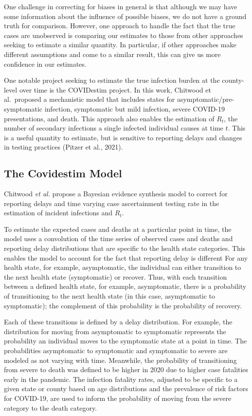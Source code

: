 \documentclass[12pt,twoside]{smiththesis}
\begin{document}
One challenge in correcting for biases in general is that although we may have some information about the influence of possible biases, we do not have a ground truth for comparison. However, one approach to handle the fact that the true cases are unobserved is comparing our estimates to those from other approaches seeking to estimate a similar quantity. In particular, if other approaches make different assumptions and come to a similar result, this can give us more confidence in our estimates.

One notable project seeking to estimate the true infection burden at the county-level over time is the COVIDestim project. In this work, Chitwood et al.~proposed a mechanistic model that includes states for asymptomatic/pre-symptomatic infection, symptomatic but mild infection, severe COVID-19 presentations, and death. This approach also enables the estimation of \(R_t\), the number of secondary infections a single infected individual causes at time \(t\). This is a useful quantity to estimate, but is sensitive to reporting delays and changes in testing practices (Pitzer et al., 2021).

\hypertarget{the-covidestim-model}{%
\subsection{The Covidestim Model}\label{the-covidestim-model}}

Chitwood \emph{et al.} propose a Bayesian evidence synthesis model to correct for reporting delays and time varying case ascertainment testing rate in the estimation of incident infections and \(R_t\).

To estimate the expected cases and deaths at a particular point in time, the model uses a convolution of the time series of observed cases and deaths and reporting delay distributions that are specific to the health state categories. This enables the model to account for the fact that reporting delay is different For any health state, for example, asymptomatic, the individual can either transition to the next health state (symptomatic) or recover. Thus, with each transition between a defined health state, for example, asymptomatic, there is a probability of transitioning to the next health state (in this case, asymptomatic to symptomatic); the complement of this probability is the probability of recovery.

Each of these transitions is defined by a delay distribution. For example, the distribution for moving from asymptomatic to symptomatic represents the probability an individual moves to the symptomatic state at a point in time. The probabilities asymptomatic to symptomatic and symptomatic to severe are modeled as not varying with time. Meanwhile, the probability of transitioning from severe to death was defined to be higher in 2020 due to higher case fatalities early in the pandemic. The infection fatality rates, adjusted to be specific to a given state or county based on age distributions and the prevalence of risk factors for COVID-19, are used to inform the probability of moving from the severe category to the death category.
\end{document}

